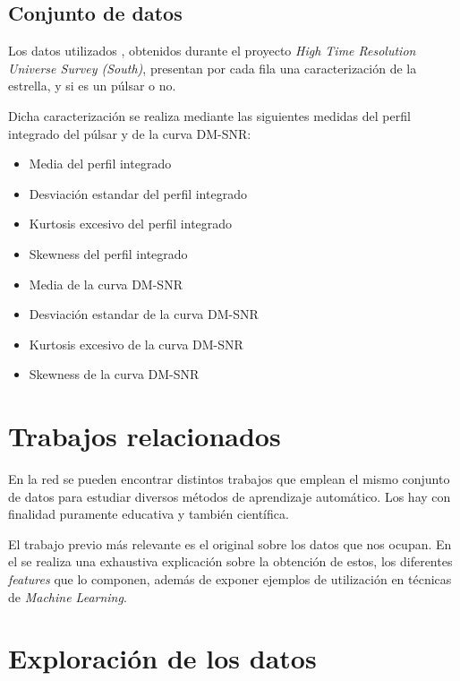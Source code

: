 \documentclass[a4paper]{article} %
\begin{document}
\subsection{Conjunto de datos}

Los datos utilizados \cite{HTRU2}, obtenidos durante el proyecto \textit{High Time Resolution Universe Survey (South)}, presentan por cada fila una caracterización de la estrella, y si es un púlsar o no. \vspace{5mm} 

Dicha caracterización se realiza mediante las siguientes medidas del perfil integrado del púlsar y de la curva DM-SNR:
\begin{itemize}
    \item Media del perfil integrado
    \item Desviación estandar del perfil integrado
    \item Kurtosis excesivo del perfil integrado
    \item Skewness del perfil integrado
    \item Media de la curva DM-SNR
    \item Desviación estandar de la curva DM-SNR
    \item Kurtosis excesivo de la curva DM-SNR
    \item Skewness de la curva DM-SNR
\end{itemize}


\section{Trabajos relacionados}
En la red se pueden encontrar distintos trabajos que emplean el mismo conjunto de datos para estudiar diversos métodos de aprendizaje automático. Los hay con finalidad puramente educativa y también científica.\vspace{5mm}

El trabajo previo más relevante es el original \cite{Lyon} sobre los datos que nos ocupan. En el se realiza una exhaustiva explicación sobre la obtención de estos, los diferentes \textit{features} que lo componen, además de exponer ejemplos de utilización en técnicas de \textit{Machine Learning}.



\section{Exploración de los datos}
\end{document}
